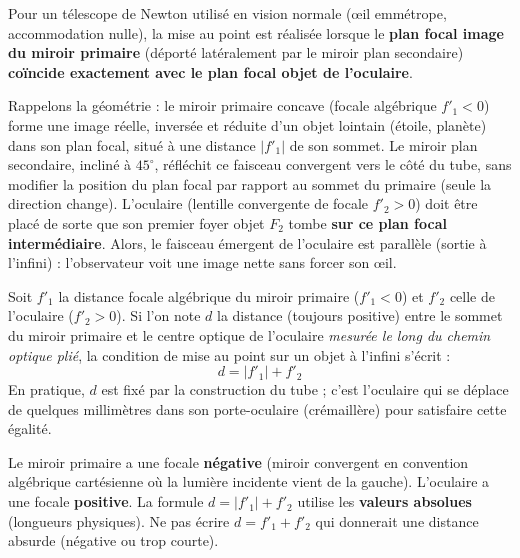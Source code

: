 \documentclass[11pt]{article}
\begin{document}
\begin{definition}
Pour un télescope de Newton utilisé en vision normale (œil emmétrope, accommodation nulle), la mise au point est réalisée lorsque le \textbf{plan focal image du miroir primaire} (déporté latéralement par le miroir plan secondaire) \textbf{coïncide exactement avec le plan focal objet de l'oculaire}.
\end{definition}

\par
Rappelons la géométrie : le miroir primaire concave (focale algébrique $f'_1 < 0$) forme une image réelle, inversée et réduite d'un objet lointain (étoile, planète) dans son plan focal, situé à une distance $|f'_1|$ de son sommet. Le miroir plan secondaire, incliné à $45^\circ$, réfléchit ce faisceau convergent vers le côté du tube, sans modifier la position du plan focal par rapport au sommet du primaire (seule la direction change). L'oculaire (lentille convergente de focale $f'_2 > 0$) doit être placé de sorte que son premier foyer objet $F_2$ tombe \textbf{sur ce plan focal intermédiaire}. Alors, le faisceau émergent de l'oculaire est parallèle (sortie à l'infini) : l'observateur voit une image nette sans forcer son œil.

\begin{propriete}
Soit $f'_1$ la distance focale algébrique du miroir primaire ($f'_1 < 0$) et $f'_2$ celle de l'oculaire ($f'_2 > 0$). Si l'on note $d$ la distance (toujours positive) entre le sommet du miroir primaire et le centre optique de l'oculaire \emph{mesurée le long du chemin optique plié}, la condition de mise au point sur un objet à l'infini s'écrit :
\[
d = |f'_1| + f'_2
\]
En pratique, $d$ est fixé par la construction du tube ; c'est l'oculaire qui se déplace de quelques millimètres dans son porte-oculaire (crémaillère) pour satisfaire cette égalité.
\end{propriete}

\begin{attention}
Le miroir primaire a une focale \textbf{négative} (miroir convergent en convention algébrique cartésienne où la lumière incidente vient de la gauche). L'oculaire a une focale \textbf{positive}. La formule $d = |f'_1| + f'_2$ utilise les \textbf{valeurs absolues} (longueurs physiques). Ne pas écrire $d = f'_1 + f'_2$ qui donnerait une distance absurde (négative ou trop courte).
\end{attention}
\end{document}
